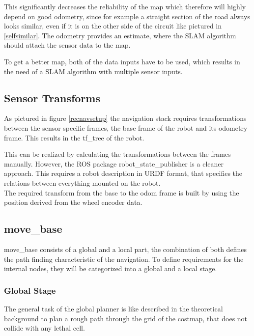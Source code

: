 This significantly decreases the reliability of the map which therefore will highly depend on good odometry, since for example a straight section of the road always looks similar, even if it is on the other side of the circuit like pictured in \ref{selfsimilar}. The odometry provides an estimate, where the SLAM algorithm should attach the sensor data to the map.

To get a better map, both of the data inputs have to be used, which results in the need of a SLAM algorithm with multiple sensor inputs.\\

\subsection{Sensor Transforms}

As pictured in figure \ref{recnavsetup} the navigation stack requires transformations between the sensor specific frames, the base frame of the robot and its odometry frame. This results in the tf\_tree of the robot.

This can be realized by calculating the transformations between the frames manually. However, the ROS package robot\_state\_publisher is a cleaner approach. This requires a robot description in URDF format, that specifies the relations between everything mounted on the robot.\\

The required transform from the base to the odom frame is built by using the position derived from the wheel encoder data.

\subsection{move\_base}

move\_base consists of a global and a local part, the combination of both defines the path finding characteristic of the navigation. 
To define requirements for the internal nodes, they will be categorized into a global and a local stage.

\subsubsection{Global Stage}
The general task of the global planner is like described in the theoretical background to plan a rough path through the grid of the costmap, that does not collide with any lethal cell.\\

